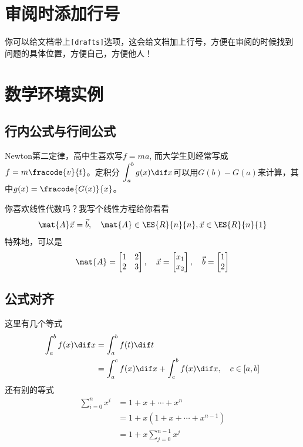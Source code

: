 \section{审阅时添加行号}
你可以给文档带上\lstinline|[drafts]|选项，这会给文档加上行号，方便在审阅的时候找到问题的具体位置，方便自己，方便他人！


\section{数学环境实例}

\subsection{行内公式与行间公式}

Newton第二定律，高中生喜欢写$f=ma$, 而大学生则经常写成$\displaystyle{f=m\fracode{v}{t}}$。定积分
$\displaystyle{\int^b_a g(x)\dif x}$可以用$G(b)-G(a)$来计算，其中$\displaystyle g(x) = \fracode{G(x)}{x}$。

你喜欢线性代数吗？我写个线性方程给你看看
\begin{equation}
\mat{A} \vec{x}= \vec{b}, \quad \mat{A}\in \ES{R}{n}{n}, \vec{x}\in \ES{R}{n}{1}
\end{equation}
特殊地，可以是
\begin{equation}
\mat{A} = \begin{bmatrix}
1 & 2 \\
2 & 3 
\end{bmatrix},\quad
\vec{x}=\begin{bmatrix}
x_1 \\ x_2
\end{bmatrix}, \quad
\vec{b} =\begin{bmatrix}
1 \\ 2
\end{bmatrix}
\end{equation}

\subsection{公式对齐}

这里有几个等式
\begin{equation}
\begin{split}
\int^b_a f(x)\dif x 
& = \int^b_a f(t)\dif t \\
& = \int^c_a f(x)\dif x + \int^b_c f(x)\dif x, \quad c\in [a,b] 
\end{split}
\end{equation}
还有别的等式
\begin{align}
\sum^n_{i=0} x^i 
&= 1 + x + \cdots + x^n \\
&= 1 + x(1 + x + \cdots + x^{n-1}) \\
& = 1 + x \sum^{n-1}_{j=0} x^j
\end{align}

